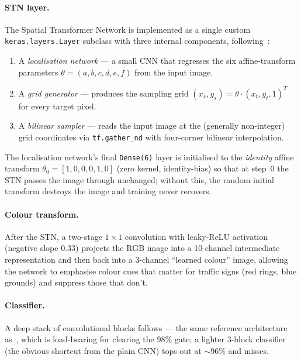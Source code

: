 \documentclass[11pt,a4paper]{article}
\begin{document}
\paragraph{STN layer.} The Spatial Transformer Network is implemented as a single custom \texttt{keras.layers.Layer} subclass with three internal components, following~\cite{jaderberg2015stn}:
\begin{enumerate}
  \item A \emph{localisation network} — a small CNN that regresses the six affine-transform parameters $\theta = (a, b, c, d, e, f)$ from the input image.
  \item A \emph{grid generator} — produces the sampling grid $(x_s, y_s) = \theta \cdot (x_t, y_t, 1)^T$ for every target pixel.
  \item A \emph{bilinear sampler} — reads the input image at the (generally non-integer) grid coordinates via \texttt{tf.gather\_nd} with four-corner bilinear interpolation.
\end{enumerate}
The localisation network's final \texttt{Dense(6)} layer is initialised to the \emph{identity} affine transform $\theta_0 = [1, 0, 0, 0, 1, 0]$ (zero kernel, identity-bias) so that at step~0 the STN passes the image through unchanged; without this, the random initial transform destroys the image and training never recovers.

\paragraph{Colour transform.} After the STN, a two-stage $1\!\times\!1$ convolution with leaky-ReLU activation (negative slope $0.33$) projects the RGB image into a 10-channel intermediate representation and then back into a 3-channel ``learned colour'' image, allowing the network to emphasise colour cues that matter for traffic signs (red rings, blue grounds) and suppress those that don't.

\paragraph{Classifier.} A deep stack of convolutional blocks follows — the same reference architecture as~\cite{hello2allgtsrb}, which is load-bearing for clearing the 98\% gate; a lighter 3-block classifier (the obvious shortcut from the plain CNN) tops out at $\sim$96\% and misses.
\end{document}
